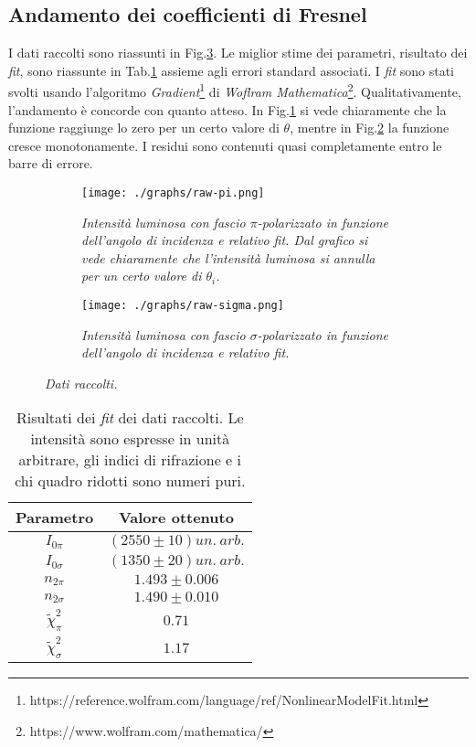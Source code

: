 \subsection{Andamento dei coefficienti di Fresnel}\label{subsec:analisi-coefficienti}
  I dati raccolti sono riassunti in Fig.\ref{fig:dati-raw}.
  Le miglior stime dei parametri, risultato dei \emph{fit}, sono riassunte in Tab.\ref{tab:risultati-fit}
  assieme agli errori standard associati.
  I \emph{fit} sono stati svolti usando l'algoritmo \emph{Gradient}\footnote{https://reference.wolfram.com/language/ref/NonlinearModelFit.html} di \emph{Woflram Mathematica}\footnote{https://www.wolfram.com/mathematica/}.
  Qualitativamente, l'andamento è concorde con quanto atteso. In Fig.\ref{fig:raw-pi}
  si vede chiaramente che la funzione raggiunge lo zero per un certo valore di $\theta$,
  mentre in Fig.\ref{fig:raw-sigma} la funzione cresce monotonamente.
  I residui sono contenuti quasi completamente entro le barre di errore.
  \begin{figure}[H]
    \centering
    \begin{subfigure}[t]{.47\textwidth}
      \texttt{[image: ./graphs/raw-pi.png]}
      \caption{
        \emph{
          Intensità luminosa con fascio $\pi$-polarizzato in funzione dell'angolo
          di incidenza e relativo fit. Dal grafico si vede chiaramente che
          l'intensità luminosa si annulla per un certo valore di $\theta_i$.
        }
      }
      \label{fig:raw-pi}
    \end{subfigure}
    \hspace{5mm}
    \begin{subfigure}[t]{.47\textwidth}
      \texttt{[image: ./graphs/raw-sigma.png]}
      \caption{
        \emph{
          Intensità luminosa con fascio $\sigma$-polarizzato in funzione dell'angolo
          di incidenza e relativo fit.
        }
      }
      \label{fig:raw-sigma}
    \end{subfigure}
    \caption{\emph{Dati raccolti.}
    \label{fig:dati-raw}}
  \end{figure}
  \begin{table}[H]
    \centering
    \begin{tabular}[t]{cc}
      \toprule
      Parametro &Valore ottenuto\\
      \midrule
      $I_{0\pi}$ &$(2550 \pm 10) un.\ arb.$ \\
      $I_{0\sigma}$ &$(1350 \pm 20) un.\ arb.$ \\
      $n_{2\pi}$ &$1.493 \pm 0.006$    \\
      $n_{2\sigma}$ &$1.490 \pm 0.010$    \\
      $\tilde \chi^2_\pi$ &$0.71$ \\
      $\tilde \chi^2_\sigma$ &$1.17$ \\
      \bottomrule
      \end{tabular}
    \caption{
      Risultati dei \emph{fit} dei dati raccolti. Le intensità sono espresse in unità arbitrare, gli indici
      di rifrazione e i chi quadro ridotti sono numeri puri.
    }
    \label{tab:risultati-fit}
  \end{table}
